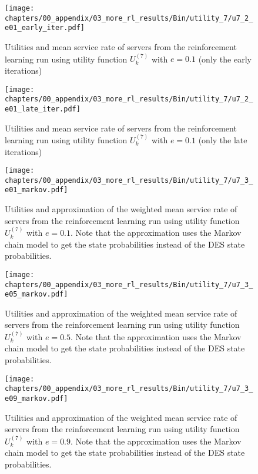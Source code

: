 \begin{figure}[H]
    \texttt{[image: chapters/00\_appendix/03\_more\_rl\_results/Bin/utility\_7/u7\_2\_e01\_early\_iter.pdf]}
    \caption{Utilities and mean service rate of servers from the reinforcement
    learning run using utility function \(U_k^{(7)}\) with \(e = 0.1\) (only
    the early iterations)}
    \label{fig:RL_utility7_2_e01_early_iter}
\end{figure}

\begin{figure}[H]
    \texttt{[image: chapters/00\_appendix/03\_more\_rl\_results/Bin/utility\_7/u7\_2\_e01\_late\_iter.pdf]}
    \caption{Utilities and mean service rate of servers from the reinforcement
    learning run using utility function \(U_k^{(7)}\) with \(e = 0.1\) (only
    the late iterations)}
    \label{fig:RL_utility7_2_e01_late_iter}
\end{figure}

\begin{figure}[H]
    \texttt{[image: chapters/00\_appendix/03\_more\_rl\_results/Bin/utility\_7/u7\_3\_e01\_markov.pdf]}
    \caption{Utilities and approximation of the weighted mean service rate of
    servers from the reinforcement learning run using utility function
    \(U_k^{(7)}\) with \(e = 0.1\). Note that the approximation uses the Markov
    chain model to get the state probabilities instead of the DES state
    probabilities.}
    \label{fig:RL_utility7_3_e01_markov}
\end{figure}

\begin{figure}[H]
    \texttt{[image: chapters/00\_appendix/03\_more\_rl\_results/Bin/utility\_7/u7\_3\_e05\_markov.pdf]}
    \caption{Utilities and approximation of the weighted mean service rate of
    servers from the reinforcement learning run using utility function
    \(U_k^{(7)}\) with \(e = 0.5\). Note that the approximation uses the Markov
    chain model to get the state probabilities instead of the DES state
    probabilities.}
    \label{fig:RL_utility7_3_e05_markov}
\end{figure}

\begin{figure}[H]
    \texttt{[image: chapters/00\_appendix/03\_more\_rl\_results/Bin/utility\_7/u7\_3\_e09\_markov.pdf]}
    \caption{Utilities and approximation of the weighted mean service rate of
    servers from the reinforcement learning run using utility function
    \(U_k^{(7)}\) with \(e = 0.9\). Note that the approximation uses the Markov
    chain model to get the state probabilities instead of the DES state
    probabilities.}
    \label{fig:RL_utility7_3_e09_markov}
\end{figure}


